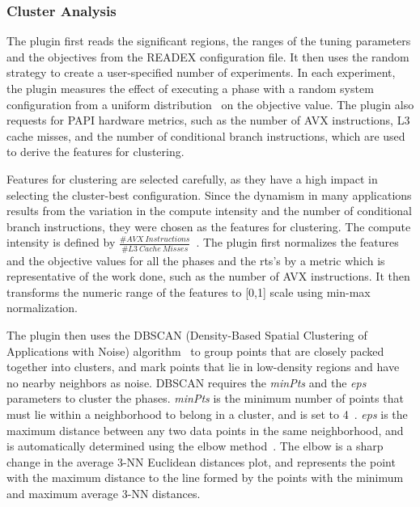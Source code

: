 \subsubsection{Cluster Analysis} \label{cluster-analysis} 

The plugin first reads the significant regions, the ranges of the tuning parameters and the objectives from the READEX configuration file. It then uses the random strategy to create a user-specified number of experiments. In each experiment, the plugin measures the effect of executing a phase with a random system configuration from a uniform distribution~\cite{AutoTune:Book2015} on the objective value. The plugin also requests for PAPI hardware metrics, such as the number of AVX instructions, L3 cache misses, and the number of conditional branch instructions, which are used to derive the features for clustering.

Features for clustering are selected carefully, as they have a high impact in selecting the cluster-best configuration. Since the dynamism in many applications results from the variation in the compute intensity and the number of conditional branch instructions, they were chosen as the features for clustering. The compute intensity is defined by $\frac{\#AVX\ Instructions}{\#L3\ Cache\ Misses}$~\cite{PDPTA_18_Kumaraswamy}. The plugin first normalizes the features and the objective values for all the phases and the rts's by a metric which is representative of the work done, such as the number of AVX instructions. It then transforms the numeric range of the features to [0,1] scale using min-max normalization.

The plugin then uses the DBSCAN (Density-Based Spatial Clustering of Applications with Noise) algorithm~\cite{Ester-1996} to group points that are closely packed together into clusters, and mark points that lie in low-density regions and have no nearby neighbors as noise. DBSCAN requires the \textit{minPts} and the \textit{eps} parameters to cluster the phases. \textit{minPts} is the minimum number of points that must lie within a neighborhood to belong in a cluster, and is set to 4~\cite{Sander-1998}. \textit{eps} is the maximum distance between any two data points in the same neighborhood, and is automatically determined using the elbow method~\cite{gaonkar2013autoepsdbscan}. The elbow is a sharp change in the average 3-NN Euclidean distances plot, and represents the point with the maximum distance to the line formed by the points with the minimum and maximum average 3-NN distances.

